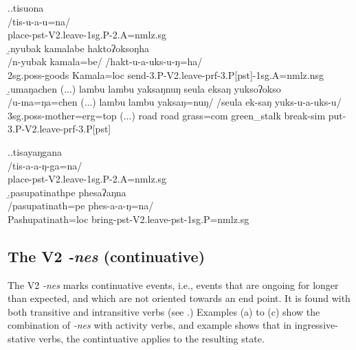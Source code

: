  \ex.\a.\glll tisuona\\
 /tis-u-a-u=na/\\
 place{\sc -pst-V2.leave-1sg.P-2.A=nmlz.sg}\\
 \b.\glll nyubak kamalabe haktoʔoksoŋha\\
 /n-yubak kamala=be/ /hakt-u-a-uks-u-ŋ=ha/\\
 {\sc 2sg.poss-}goods Kamala{\sc =loc} send{\sc -3.P-V2.leave-prf-3.P[pst]-1sg.A=nmlz.nsg}\\
 \b.\glll umaŋachen (...) lambu lambu yaksaŋnuŋ seula               eksaŋ         yuksoʔokso\\
 /u-ma=ŋa=chen (...) lambu lambu yaksaŋ=nuŋ/ /seula               ek-saŋ         yuks-u-a-uks-u/\\
{\sc 3sg.poss-}mother{\sc =erg=top} (...) road road  grass{\sc =com} green\_stalk break{\sc -sim} put{\sc -3.P-V2.leave-prf-3.P[pst]}\\
   
 
 
 \ex.\a.\glll tisayaŋgana\\
 /tis-a-a-ŋ-ga=na/\\
 place{\sc -pst-V2.leave-1sg.P-2.A=nmlz.sg}\\
 \b.\glll pasupatinathpe phesaʔaŋna\\
 /pasupatinath=pe phes-a-a-ŋ=na/\\
Pashupatinath{\sc =loc} bring{\sc -pst-V2.leave-pst-1sg.P=nmlz.sg}\\



\subsection{The V2 \emph{-nes}  (continuative)}\label{V2-lay}%

The V2 \emph{-nes}  marks continuative events, i.e., events that are ongoing for longer than expected, and which are not oriented towards an end point. It is found with both transitive and intransitive verbs (see \Next.) Examples (a) to (c) show the combination of \emph{-nes} with activity verbs,  and example \Next[d] shows that in ingressive-stative verbs, the contintuative applies to the resulting state.
 
